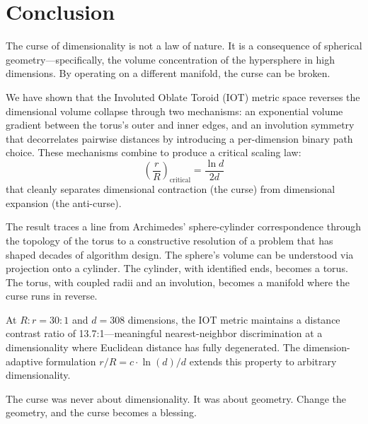 \section{Conclusion}
\label{sec:conclusion}

The curse of dimensionality is not a law of nature. It is a consequence of spherical geometry---specifically, the volume concentration of the hypersphere in high dimensions. By operating on a different manifold, the curse can be broken.

We have shown that the Involuted Oblate Toroid (IOT) metric space reverses the dimensional volume collapse through two mechanisms: an exponential volume gradient between the torus's outer and inner edges, and an involution symmetry that decorrelates pairwise distances by introducing a per-dimension binary path choice. These mechanisms combine to produce a critical scaling law:
\begin{equation*}
    \left(\frac{r}{R}\right)_{\text{critical}} = \frac{\ln d}{2d}
\end{equation*}
that cleanly separates dimensional contraction (the curse) from dimensional expansion (the anti-curse).

The result traces a line from Archimedes' sphere-cylinder correspondence through the topology of the torus to a constructive resolution of a problem that has shaped decades of algorithm design. The sphere's volume can be understood via projection onto a cylinder. The cylinder, with identified ends, becomes a torus. The torus, with coupled radii and an involution, becomes a manifold where the curse runs in reverse.

At $R{:}r = 30{:}1$ and $d = 308$ dimensions, the IOT metric maintains a distance contrast ratio of 13.7:1---meaningful nearest-neighbor discrimination at a dimensionality where Euclidean distance has fully degenerated. The dimension-adaptive formulation $r/R = c \cdot \ln(d)/d$ extends this property to arbitrary dimensionality.

The curse was never about dimensionality. It was about geometry. Change the geometry, and the curse becomes a blessing.

